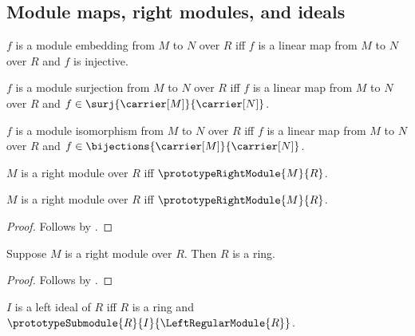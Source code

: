 \subsection{Module maps, right modules, and ideals}

\begin{definition}\label{spike_phrase_module_embedding}
    $f$ is a module embedding from $M$ to $N$ over $R$ iff
        $f$ is a linear map from $M$ to $N$ over $R$ and
        $f$ is injective.
\end{definition}

\begin{definition}\label{spike_phrase_module_surjection}
    $f$ is a module surjection from $M$ to $N$ over $R$ iff
        $f$ is a linear map from $M$ to $N$ over $R$ and
        $f\in\surj{\carrier[M]}{\carrier[N]}$.
\end{definition}

\begin{definition}\label{spike_phrase_module_isomorphism}
    $f$ is a module isomorphism from $M$ to $N$ over $R$ iff
        $f$ is a linear map from $M$ to $N$ over $R$ and
        $f\in\bijections{\carrier[M]}{\carrier[N]}$.
\end{definition}

\begin{definition}\label{spike_phrase_right_module}
    $M$ is a right module over $R$ iff
        $\prototypeRightModule{M}{R}$.
\end{definition}

\begin{theorem}\label{spike_phrase_right_module_equivalence}
    $M$ is a right module over $R$ iff
        $\prototypeRightModule{M}{R}$.
\end{theorem}
\begin{proof}
    Follows by .
\end{proof}

\begin{proposition}\label{spike_phrase_right_module_guard}
    Suppose $M$ is a right module over $R$.
    Then $R$ is a ring.
\end{proposition}
\begin{proof}
    Follows by
        .
\end{proof}

\begin{definition}\label{spike_phrase_left_ideal}
    $I$ is a left ideal of $R$ iff
        $R$ is a ring and
        $\prototypeSubmodule{R}{I}{\LeftRegularModule{R}}$.
\end{definition}

